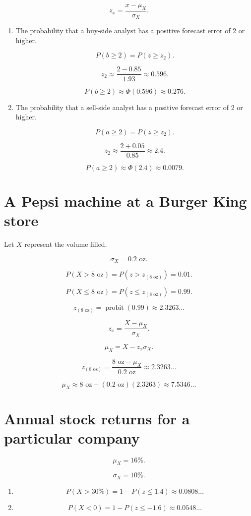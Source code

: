 \documentclass[12pt]{article}
\DeclareMathOperator{\probit}{probit}
\begin{document}
\[z_x=\frac{x-\mu_X}{\sigma_X}.\]
\begin{enumerate}
\item The probability that a buy-side analyst has a positive forecast error of 2 or higher.

\[P(b\geq 2)=P(z\geq z_2).\]

\[z_2\approx\frac{2-0.85}{1.93}\approx 0.596.\]

\[P(b\geq 2)\approx\Phi(0.596)\approx 0.276.\]
\item The probability that a sell-side analyst has a positive forecast error of 2 or higher.

\[P(a\geq 2)=P(z\geq z_2).\]

\[z_2\approx\frac{2+0.05}{0.85}\approx 2.4.\]

\[P(a\geq 2)\approx\Phi(2.4)\approx 0.0079.\]
\end{enumerate}
\section{A Pepsi machine at a Burger King store}
Let $X$ represent the volume filled.

\[\sigma_X=0.2\text{ oz}.\]

\[P(X>8\text{ oz})=P\left(z>z_{(8\text{ oz})}\right)=0.01.\]

\[P(X\leq 8\text{ oz})=P\left(z\leq z_{(8\text{ oz})}\right)=0.99.\]

\[z_{(8\text{ oz})}=\probit(0.99)\approx 2.3263\dots\]

\[z_x=\frac{X-\mu_X}{\sigma_X}.\]

\[\mu_X=X-z_x\sigma_X.\]

\[z_{(8\text{ oz})}=\frac{8\text{ oz}-\mu_X}{0.2\text{ oz}}\approx 2.3263\dots\]

\[\mu_X\approx 8\text{ oz}-(0.2\text{ oz})(2.3263)\approx 7.5346\dots\]
\section{Annual stock returns for a particular company}
\[\mu_X=16\%.\]

\[\sigma_X=10\%.\]

\begin{enumerate}
    \item\[P(X>30\%)=1-P(z\leq 1.4)\approx 0.0808\dots\]
    \item\[P(X<0)=1-P(z\leq -1.6)\approx 0.0548\dots\]
\end{enumerate}
\end{document}
